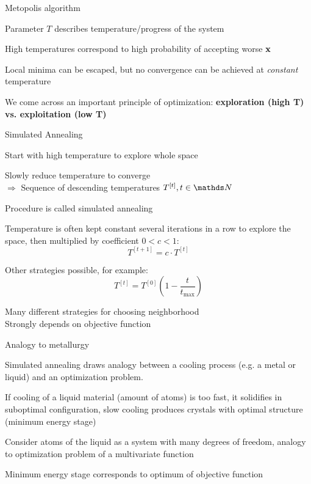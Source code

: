 \documentclass[11pt,compress,t,notes=noshow, xcolor=table]{beamer}
\begin{document}
\begin{framei}{Metopolis algorithm}
\item Parameter $T$ describes temperature/progress of the system
\item High temperatures correspond to high probability of accepting worse $\mathbf{x}$
\item Local minima can be escaped, but no convergence can be achieved at \textit{constant} temperature
\item We come across an important principle of optimization: \textbf{exploration (high T) vs. exploitation (low T)}
\lz
{}
\end{framei}

\begin{framei}{Simulated Annealing}
\item Start with high temperature to explore whole space
\item Slowly reduce temperature to converge \\
$\Rightarrow$ Sequence of descending temperatures $T^{[t]}, t \in \N$
\item Procedure is called simulated annealing
\item Temperature is often kept constant several iterations in a row to explore the space, then multiplied by coefficient $0<c<1$: 
$$T^{[t+1]} = c \cdot T^{[t]}$$
\item Other strategies possible, for example: 
$$T^{[t]} = T^{[0]} \left( 1 - \frac{t}{t_{\text{max}}} \right)$$
\item Many different strategies for choosing neighborhood\\
Strongly depends on objective function
\end{framei}

\begin{framei}[fs=normalsize,sep=L]{Analogy to metallurgy}
\item Simulated annealing draws analogy between a cooling process (e.g. a metal or liquid) and an optimization problem.
\item If cooling of a liquid material (amount of atoms) is too fast, it solidifies in suboptimal configuration, slow cooling produces crystals with optimal structure (minimum energy stage)
\item Consider atoms of the liquid as a system with many degrees of freedom, analogy to optimization problem of a multivariate function
\item Minimum energy stage corresponds to optimum of objective function
\end{framei}

\endlecture
\end{document}
